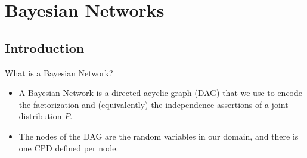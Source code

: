 \documentclass[11pt]{beamer}
\begin{document}
\section{Bayesian Networks \cite{pgmbook}}
\subsection{Introduction}

\begin{frame}{What is a Bayesian Network?}
\begin{itemize}
	\item A Bayesian Network is a directed acyclic graph (DAG) that we use
	to encode the factorization and (equivalently) the independence
	assertions of a joint distribution $P$.
	\item The nodes of the DAG are the random variables in our domain, and
	there is one CPD defined per node.
\end{itemize}
\end{frame}
\end{document}
